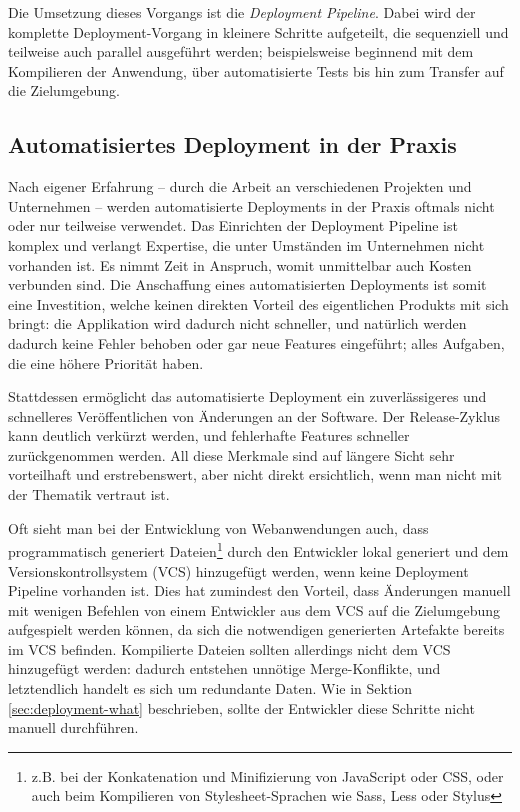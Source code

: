 \documentclass{scrartcl}
\begin{document}
Die Umsetzung dieses Vorgangs ist die \emph{Deployment Pipeline}. Dabei wird der komplette Deployment-Vorgang in kleinere Schritte aufgeteilt, die sequenziell und teilweise auch parallel ausgeführt werden; beispielsweise beginnend mit dem Kompilieren der Anwendung, über automatisierte Tests bis hin zum Transfer auf die Zielumgebung. \citep{FowlerDP}

\subsection{Automatisiertes Deployment in der Praxis}
\label{sec:deployment-real}

Nach eigener Erfahrung – durch die Arbeit an verschiedenen Projekten und Unternehmen – werden automatisierte Deployments in der Praxis oftmals nicht oder nur teilweise verwendet. Das Einrichten der Deployment Pipeline ist komplex und verlangt Expertise, die unter Umständen im Unternehmen nicht vorhanden ist. Es nimmt Zeit in Anspruch, womit unmittelbar auch Kosten verbunden sind. Die Anschaffung eines automatisierten Deployments ist somit eine Investition, welche keinen direkten Vorteil des eigentlichen Produkts mit sich bringt: die Applikation wird dadurch nicht schneller, und natürlich werden dadurch keine Fehler behoben oder gar neue Features eingeführt; alles Aufgaben, die eine höhere Priorität haben.

Stattdessen ermöglicht das automatisierte Deployment ein zuverlässigeres und schnelleres Veröffentlichen von Änderungen an der Software. Der Release-Zyklus kann deutlich verkürzt werden, und fehlerhafte Features schneller zurückgenommen werden. \citep[11f]{Humble2010} All diese Merkmale sind auf längere Sicht sehr vorteilhaft und erstrebenswert, aber nicht direkt ersichtlich, wenn man nicht mit der Thematik vertraut ist.

Oft sieht man bei der Entwicklung von Webanwendungen auch, dass programmatisch generiert Dateien\footnote{z.B. bei der Konkatenation und Minifizierung von JavaScript oder CSS, oder auch beim Kompilieren von Stylesheet-Sprachen wie Sass, Less oder Stylus} durch den Entwickler lokal generiert und dem Versionskontrollsystem (VCS) hinzugefügt werden, wenn keine Deployment Pipeline vorhanden ist. Dies hat zumindest den Vorteil, dass Änderungen manuell mit wenigen Befehlen von einem Entwickler aus dem VCS auf die Zielumgebung aufgespielt werden können, da sich die notwendigen generierten Artefakte bereits im VCS befinden. Kompilierte Dateien sollten allerdings nicht dem VCS hinzugefügt werden: dadurch entstehen unnötige Merge-Konflikte, und letztendlich handelt es sich um redundante Daten. Wie in Sektion \ref{sec:deployment-what} beschrieben, sollte der Entwickler diese Schritte nicht manuell durchführen.
\end{document}
